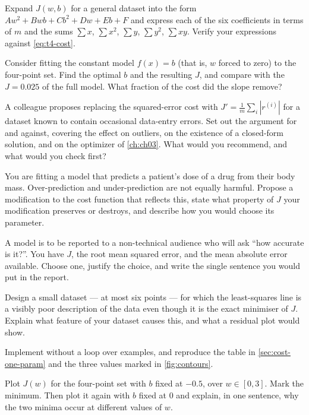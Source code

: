 \ap Expand $J(w,b)$ for a general dataset into the form
$Aw^2 + Bwb + Cb^2 + Dw + Eb + F$ and express each of the six coefficients in
terms of $m$ and the sums $\sum x$, $\sum x^2$, $\sum y$, $\sum y^2$,
$\sum xy$. Verify your expressions against \cref{eq:t4-cost}.

\ap Consider fitting the constant model $f(x) = b$ (that is, $w$ forced to zero)
to the four-point set. Find the optimal $b$ and the resulting $J$, and compare
with the $J = 0.025$ of the full model. What fraction of the cost did the slope
remove?


\dpr A colleague proposes replacing the squared-error cost with
$J' = \frac{1}{m}\sum_i |r^{(i)}|$ for a dataset known to contain occasional
data-entry errors. Set out the argument for and against, covering the effect on
outliers, on the existence of a closed-form solution, and on the optimizer of
\cref{ch:ch03}. What would you recommend, and what would you check first?

\dpr You are fitting a model that predicts a patient's dose of a drug from their
body mass. Over-prediction and under-prediction are not equally harmful. Propose
a modification to the cost function that reflects this, state what property of
$J$ your modification preserves or destroys, and describe how you would choose
its parameter.

\dpr A model is to be reported to a non-technical audience who will ask ``how
accurate is it?''. You have $J$, the root mean squared error, and the mean
absolute error available. Choose one, justify the choice, and write the single
sentence you would put in the report.

\dpr Design a small dataset --- at most six points --- for which the
least-squares line is a visibly poor description of the data even though it is
the exact minimiser of $J$. Explain what feature of your dataset causes this,
and what a residual plot would show.


\pe Implement  without a loop over examples, and
reproduce the table in \cref{sec:cost-one-param} and the three values marked in
\cref{fig:contours}.

\pe Plot $J(w)$ for the four-point set with $b$ fixed at $-0.5$, over
$w \in [0, 3]$. Mark the minimum. Then plot it again with $b$ fixed at $0$ and
explain, in one sentence, why the two minima occur at different values of $w$.

